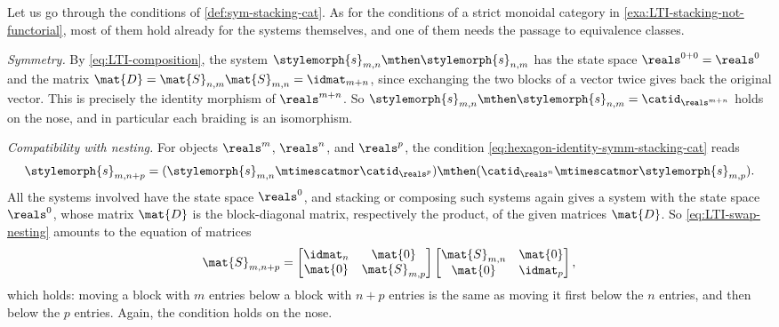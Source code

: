 \begin{example}
    Let us go through the conditions of \cref{def:sym-stacking-cat}.
    As for the conditions of a strict monoidal category in \cref{exa:LTI-stacking-not-functorial}, most of them hold already for the systems themselves, and one of them needs the passage to equivalence classes.

    \emph{Symmetry.}
    By \cref{eq:LTI-composition}, the system $\stylemorph{s}_{m,n} \mthen \stylemorph{s}_{n,m}$ has the state space $\reals^{0+0} = \reals^0$ and the matrix $\mat{D} = \mat{S}_{n,m}\mat{S}_{m,n} = \idmat_{m+n}$, since exchanging the two blocks of a vector twice gives back the original vector.
    This is precisely the identity morphism of $\reals^{m+n}$.
    So $\stylemorph{s}_{m,n} \mthen \stylemorph{s}_{n,m} = \catid_{\reals^{m+n}}$ holds on the nose, and in particular each braiding is an isomorphism.

    \emph{Compatibility with nesting.}
    For objects $\reals^m$, $\reals^n$, and $\reals^p$, the condition \cref{eq:hexagon-identity-symm-stacking-cat} reads
    \begin{equation}
        \label{eq:LTI-swap-nesting}
        \stylemorph{s}_{m,n+p} = (\stylemorph{s}_{m,n} \mtimescatmor \catid_{\reals^p}) \mthen (\catid_{\reals^n} \mtimescatmor \stylemorph{s}_{m,p}).
    \end{equation}
    All the systems involved have the state space $\reals^0$, and stacking or composing such systems again gives a system with the state space $\reals^0$, whose matrix $\mat{D}$ is the block-diagonal matrix, respectively the product, of the given matrices $\mat{D}$.
    So \cref{eq:LTI-swap-nesting} amounts to the equation of matrices
    \begin{equation}
        \mat{S}_{m,n+p} =
        \begin{bmatrix}
            \idmat_n & \mat{0}       \\
            \mat{0}  & \mat{S}_{m,p}
        \end{bmatrix}
        \begin{bmatrix}
            \mat{S}_{m,n} & \mat{0}  \\
            \mat{0}       & \idmat_p
        \end{bmatrix},
    \end{equation}
    which holds: moving a block with $m$ entries below a block with $n + p$ entries is the same as moving it first below the $n$ entries, and then below the $p$ entries.
    Again, the condition holds on the nose.


\end{example}
